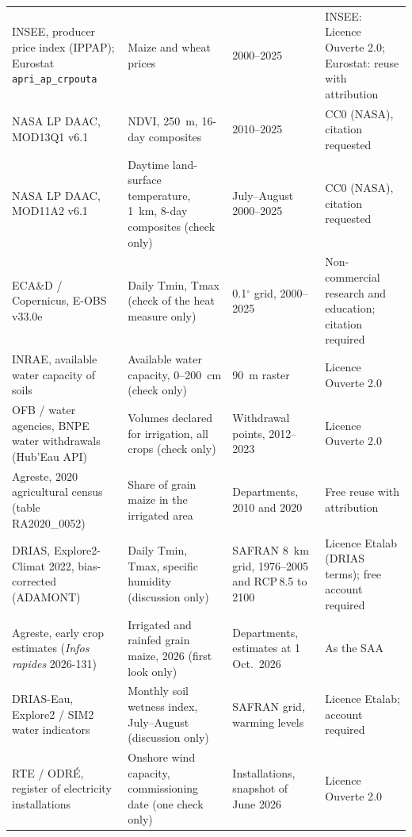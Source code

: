 \begin{table}[tp]
\begin{tabular}{>{\raggedright}p{4.4cm}>{\raggedright}p{4.3cm}>{\raggedright}p{2.6cm}>{\raggedright\arraybackslash}p{2.6cm}}
INSEE, producer price index (IPPAP); Eurostat \texttt{apri\_ap\_crpouta} & Maize and wheat prices & 2000--2025 & INSEE: Licence Ouverte 2.0; Eurostat: reuse with attribution \\
NASA LP DAAC, MOD13Q1 v6.1 \parencite{didan2021} & NDVI, 250~m, 16-day composites & 2010--2025 & CC0 (NASA), citation requested \\
NASA LP DAAC, MOD11A2 v6.1 \parencite{wan2021} & Daytime land-surface temperature, 1~km, 8-day composites (check only) & July--August 2000--2025 & CC0 (NASA), citation requested \\
ECA\&D / Copernicus, E-OBS v33.0e \parencite{cornes2018} & Daily Tmin, Tmax (check of the heat measure only) & 0.1$^{\circ}$ grid, 2000--2025 & Non-commercial research and education; citation required \\
INRAE, available water capacity of soils \parencite{romandobarco2019} & Available water capacity, 0--200~cm (check only) & 90~m raster & Licence Ouverte 2.0 \\
OFB / water agencies, BNPE water withdrawals (Hub'Eau API) & Volumes declared for irrigation, all crops (check only) & Withdrawal points, 2012--2023 & Licence Ouverte 2.0 \\
Agreste, 2020 agricultural census (table RA2020\_0052) & Share of grain maize in the irrigated area & Departments, 2010 and 2020 & Free reuse with attribution \\
DRIAS, Explore2-Climat 2022, bias-corrected (ADAMONT) \parencite{drias2022} & Daily Tmin, Tmax, specific humidity (discussion only) & SAFRAN 8~km grid, 1976--2005 and RCP\,8.5 to 2100 & Licence Etalab (DRIAS terms); free account required \\
Agreste, early crop estimates (\emph{Infos rapides} 2026-131) \parencite{agreste2026conjoncture} & Irrigated and rainfed grain maize, 2026 (first look only) & Departments, estimates at 1 Oct.~2026 & As the SAA \\
DRIAS-Eau, Explore2 / SIM2 water indicators \parencite{driaseau2024} & Monthly soil wetness index, July--August (discussion only) & SAFRAN grid, warming levels & Licence Etalab; account required \\
RTE / ODRÉ, register of electricity installations & Onshore wind capacity, commissioning date (one check only) & Installations, snapshot of June 2026 & Licence Ouverte 2.0 \\
\bottomrule
\end{tabular}


\end{table}
